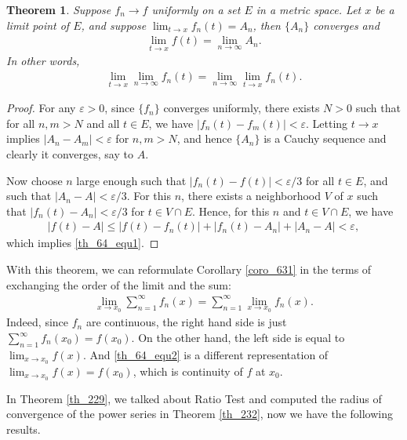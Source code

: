 \documentclass[11pt]{book}
\newtheorem{theorem}{Theorem}[chapter]
\theoremstyle{definition}
\numberwithin{equation}{chapter}
\begin{document}
\begin{theorem}\label{th_64}
Suppose $f_n \to f$ uniformly on a set $E$ in a metric space. Let $x$ be a limit point of $E$, and suppose $\lim_{t\to x} f_n(t) = A_n$, then $\{A_n\}$ converges and
\begin{align}\label{th_64_equ1}
    \lim_{t\to x} f(t) = \lim_{n\to\infty} A_n.
\end{align}
In other words,
\begin{align*}
    \lim_{t\to x} \lim_{n\to\infty} f_n(t) = \lim_{n\to\infty} \lim_{t\to x} f_n(t).
\end{align*}
\end{theorem}
\begin{proof}
For any $\varepsilon > 0$, since $\{f_n\}$ converges uniformly, there exists $N > 0$ such that for all $n,m > N$ and all $t \in E$, we have $\left|f_n(t) - f_m(t)\right| < \varepsilon$. Letting $t \to x$ implies $\left|A_n - A_m\right| < \varepsilon$ for $n,m > N$, and hence $\{A_n\}$ is a Cauchy sequence and clearly it converges, say to $A$. 

Now choose $n$ large enough such that $\left|f_n(t) - f(t)\right| < \varepsilon/3$ for all $t \in E$, and such that $\left|A_n - A\right| < \varepsilon/3$. For this $n$, there exists a neighborhood $V$ of $x$ such that $\left|f_n(t) - A_n\right| < \varepsilon/3$ for $t \in V \cap E$. Hence, for this $n$ and $t \in V \cap E$, we have
\begin{align*}
    \left|f(t) - A\right| \leq \left|f(t) - f_n(t)\right| + \left|f_n(t) - A_n\right| + \left|A_n - A\right| < \varepsilon,
\end{align*}
which implies \eqref{th_64_equ1}.
\end{proof}

\medskip

With this theorem, we can reformulate Corollary \ref{coro_631} in the terms of exchanging the order of the limit and the sum:
\begin{align}\label{th_64_equ2}
    \lim_{x\to x_0} \sum^\infty_{n=1} f_n(x) = \sum^\infty_{n=1} \lim_{x\to x_0} f_n(x).
\end{align}
Indeed, since $f_n$ are continuous, the right hand side is just $\sum^\infty_{n=1} f_n(x_0) = f(x_0)$. On the other hand,  the left side is equal to $\lim_{x \to x_0} f(x)$. And \eqref{th_64_equ2} is a different representation of $\lim_{x\to x_0} f(x) = f(x_0)$, which is continuity of $f$ at $x_0$.

\medskip

In Theorem \ref{th_229}, we talked about Ratio Test and computed the radius of convergence of the power series in Theorem \ref{th_232}, now we have the following results.
\end{document}
